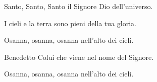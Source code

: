 
Santo, Santo, Santo il Signore Dio dell'universo. 

\spazio

I cieli e la terra sono pieni della tua gloria. 

\spazio

Osanna, osanna, osanna nell'alto dei cieli. 

\spazio

Benedetto Colui che viene nel nome del Signore. 

\spazio

Osanna, osanna, osanna nell'alto dei cieli. 